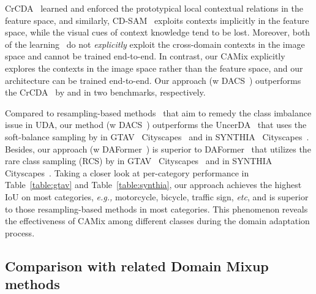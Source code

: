 \documentclass[journal]{IEEEtran}
\begin{document}
{\begin{minipage}{\textwidth}
CrCDA~\cite{CrCDA} learned and enforced the prototypical local contextual relations in the feature space, and similarly, CD-SAM~\cite{yang2021context} exploits contexts implicitly in the feature space, while the visual cues of context knowledge tend to be lost. Moreover, both of the learning~\cite{CrCDA,yang2021context} do not \textit{explicitly} exploit the cross-domain contexts in the image space and cannot be trained end-to-end. In contrast, our CAMix explicitly explores the contexts in the image space rather than the feature space, and our architecture can be trained end-to-end. Our approach (w DACS~\cite{tranheden2020dacs}) outperforms the CrCDA~\cite{CrCDA}  by  and  in two benchmarks, respectively.


Compared to resampling-based methods~\cite{wang2021uncertainty,hoyer2022daformer} that aim to remedy the class imbalance issue in UDA, our method (w DACS~\cite{tranheden2020dacs}) outperforms the UncerDA~\cite{wang2021uncertainty} that uses the soft-balance sampling by  in GTAV~\cite{stephan2016gtav}  Cityscapes~\cite{cordts2016cityscapes} and  in SYNTHIA~\cite{ros2016synthia}  Cityscapes~\cite{cordts2016cityscapes}. Besides, our approach (w DAFormer~\cite{hoyer2022daformer}) is superior to DAFormer~\cite{hoyer2022daformer} that utilizes the rare class sampling (RCS) by  in GTAV~\cite{stephan2016gtav}  Cityscapes~\cite{cordts2016cityscapes} and  in SYNTHIA~\cite{ros2016synthia}  Cityscapes~\cite{cordts2016cityscapes}. 
Taking a closer look at per-category performance in Table~\ref{table:gtav} and Table~\ref{table:synthia}, our approach achieves the highest IoU on most categories, \emph{e.g.,} motorcycle, bicycle, traffic sign, \emph{etc}, and is superior to those resampling-based methods in most categories. This phenomenon reveals the effectiveness of CAMix among different classes during the domain adaptation process.


\subsection{Comparison with related Domain Mixup methods}


\end{minipage}}
\end{document}
